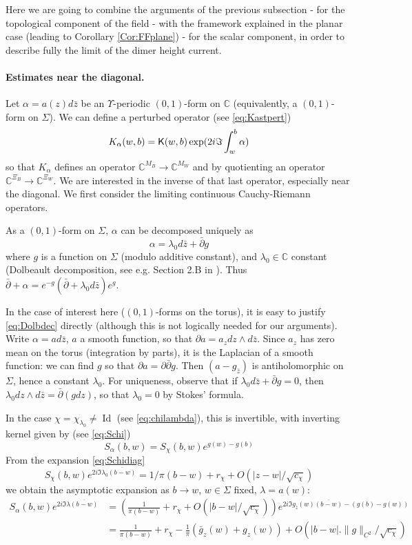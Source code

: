 \documentclass[10pt]{article}
\newcommand{\C}{\mathbb{C}}
\newcommand{\rK}{{\sf K}}
\newcommand{\dbar}{\bar\partial}
\DeclareMathOperator{\Id}{Id}
\begin{document}
Here we are going to combine the arguments of the previous subsection - for the topological component of the field - with the framework explained in the planar case (leading to Corollary \ref{Cor:FFplane}) - for the scalar component, in order to describe fully the limit of the dimer height current.


\paragraph{Estimates near the diagonal.\\} 
Let $\alpha=a(z)d\bar z$ be an $\Upsilon$-periodic $(0,1)$-form on $\C$ (equivalently, a $(0,1)$-form on $\Sigma$). We can define a perturbed operator (see \eqref{eq:Kastpert})
$$K_\alpha(w,b)=\rK(w,b)\exp(2i\Im\int_w^b\alpha)$$
%
so that $K_\alpha$ defines an operator $\C^{M_B}\rightarrow\C^{M_W}$ and by quotienting an operator $\C^{\Xi_B}\rightarrow\C^{\Xi_W}$. We are interested in the inverse of that last operator, especially near the diagonal. We first consider the limiting continuous Cauchy-Riemann operators. 

As a $(0,1)$-form on $\Sigma$, $\alpha$ can be decomposed uniquely as
\begin{equation}\label{eq:Dolbdec}
\alpha=\lambda_0 d\bar z+\dbar g
\end{equation}
where $g$ is a function on $\Sigma$ (modulo additive constant), and $\lambda_0\in\C$ constant (Dolbeault decomposition, see e.g. Section 2.B in \cite{ABMNV}). Thus $\dbar+\alpha=e^{-g}(\dbar+\lambda_0d\bar z)e^{g}$. 

In the case of interest here ($(0,1)$-forms on the torus), it is easy to justify \eqref{eq:Dolbdec} directly (although this is not logically needed for our arguments). Write $\alpha=ad\bar z$, $a$ a smooth function, so that $\partial a=a_zdz\wedge d\bar z$. Since $a_z$ has zero mean on the torus (integration by parts), it is the Laplacian of a smooth function: we can find $g$ so that $\partial a=\partial\dbar g$. Then $(a-g_{\bar z})$ is antiholomorphic on $\Sigma$, hence a constant $\lambda_0$. For uniqueness, observe that if $\lambda_0d\bar z+\dbar g=0$, then $\lambda_0dz\wedge d\bar z=\dbar(gdz)$, so that $\lambda_0=0$ by Stokes' formula.

In the case $\chi=\chi_{\lambda_0}\neq\Id$ (see \eqref{eq:chilambda}), this is invertible, with inverting kernel given by (see \eqref{eq:Schi})
$$S_\alpha(b,w)=S_{\chi}(b,w)e^{g(w)-g(b)}$$
From the expansion \eqref{eq:Schidiag}
$$S_{\chi}(b,w)e^{2i\Im\lambda_0\overline{(b-w)}}=1/\pi(b-w)+r_{\chi}+O(|z-w|/\sqrt{c_\chi})$$
we obtain the asymptotic expansion as $b\rightarrow w$, $w\in\Sigma$ fixed, $\lambda=a(w)$:
\begin{align*}
S_\alpha(b,w)e^{2i\Im\lambda\overline{(b-w)}}&=\left(\frac{1}{\pi(b-w)}+r_{\chi}+O(|b-w|/\sqrt{c_\chi})\right)e^{2i\Im g_{\bar z}(w)\overline{(b-w)}-(g(b)-g(w))}\\
&=\frac{1}{\pi(b-w)}+r_{\chi}-\frac{1}\pi(\bar g_z(w)+g_z(w))+O(|b-w|.\|g\|_{C^2}/{\sqrt{c_\chi}})
\end{align*}
\end{document}
